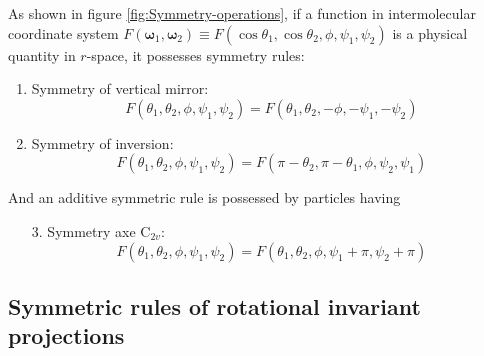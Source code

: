 As shown in figure \ref{fig:Symmetry-operations}, if a function in
intermolecular coordinate system $F(\boldsymbol{\omega}_{1},\boldsymbol{\omega}_{2})\equiv F(\cos\theta_{1},\cos\theta_{2},\phi,\psi_{1},\psi_{2})$
is a physical quantity in $r$-space, it possesses symmetry rules:
\begin{enumerate}
\item Symmetry of vertical mirror: 
\begin{equation}
F(\theta_{1},\theta_{2},\phi,\psi_{1},\psi_{2})=F(\theta_{1},\theta_{2},-\phi,-\psi_{1},-\psi_{2})\label{eq:symm_dcf_1}
\end{equation}
\item Symmetry of inversion: 
\begin{equation}
F(\theta_{1},\theta_{2},\phi,\psi_{1},\psi_{2})=F(\pi-\theta_{2},\pi-\theta_{1},\phi,\psi_{2},\psi_{1})\label{eq:symm_dcf_2}
\end{equation}
\end{enumerate}
And an additive symmetric rule is possessed by particles having 
\begin{enumerate}
\item [3.]Symmetry axe $\mathrm{C}_{2v}$: 
\begin{equation}
F(\theta_{1},\theta_{2},\phi,\psi_{1},\psi_{2})=F(\theta_{1},\theta_{2},\phi,\psi_{1}+\pi,\psi_{2}+\pi)
\end{equation}
\end{enumerate}

\subsection{Symmetric rules of rotational invariant projections}

